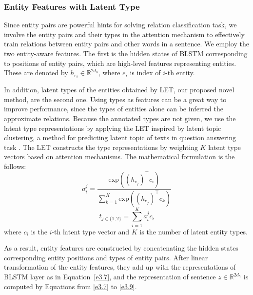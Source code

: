 \documentclass[twoside,leqno,twocolumn]{article}
\begin{document}
\subsubsection{Entity Features with Latent Type}
Since entity pairs are powerful hints for solving relation classification task, we involve the entity pairs and their types in the attention mechanism to effectively train relations between entity pairs and other words in a sentence.
We employ the two entity-aware features. 
The first is the hidden states of BLSTM corresponding to positions of entity pairs, which are high-level features representing entities.
These are denoted by $h_{e_i}\in \mathbb{R}^{2d_h}$, where $e_i$ is index of $i$-th entity.

In addition, latent types of the entities obtained by LET, our proposed novel method, are the second one.
Using types as features can be a great way to improve performance, since the types of entities alone can be inferred the approximate relations.
Because the annotated types are not given, we use the latent type representations by applying the LET inspired by latent topic clustering, a method for predicting latent topic of texts in question answering task \cite{yoon2018latent}.
The LET constructs the type representations by weighting $K$ latent type vectors based on attention mechanisms.
The mathematical formulation is the follows:
\begin{equation} 
a_i^{j}=\frac{\text{exp}((h_{e_j})^{\top}c_i)}{\sum_{k=1}^{K}\text{exp}((h_{e_j})^{\top}c_k)}
\label{e3.10}
\end{equation}
\begin{equation} 
t_{j\in\{1,2\}}=\sum_{i=1}^{K} a_i^{j} c_i
\label{e3.11}
\end{equation}
where $c_i$ is the $i$-th latent type vector and $K$ is the number of latent entity types.

As a result, entity features are constructed by concatenating the hidden states corresponding entity positions and types of entity pairs. After linear transformation of the entity features, they add up with the representations of BLSTM layer as in Equation~\ref{e3.7}, and the representation of sentence $z\in \mathbb{R}^{2d_h}$ is computed by Equations from \ref{e3.7} to \ref{e3.9}.
\end{document}
